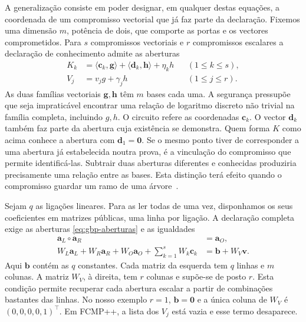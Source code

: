

A generalização consiste em poder designar, em qualquer destas equações,
a coordenada de um compromisso vectorial que já faz parte da declaração.
Fixemos uma dimensão \(m\), potência de dois, que comporte as portas
e os vectores comprometidos. Para \(s\) compromissos vectoriais e
\(r\) compromissos escalares a declaração de conhecimento admite
as aberturas
\begin{equation}
 \begin{aligned}
 K_k&=\langle\boldsymbol c_k,\boldsymbol g\rangle+
       \langle\boldsymbol d_k,\boldsymbol h\rangle+\eta_k h
       &&(1\leq k\leq s),\\
 V_j&=v_jg+\gamma_j h &&(1\leq j\leq r).
 \end{aligned}
 \label{eq:gbp-aberturas}
\end{equation}
As duas famílias vectoriais \(\boldsymbol g,\boldsymbol h\) têm
\(m\) bases cada uma. A segurança pressupõe que seja impraticável
encontrar uma relação de logaritmo discreto não trivial na família
completa, incluindo \(g,h\). O circuito refere as coordenadas
\(\boldsymbol c_k\). O vector \(\boldsymbol d_k\) também faz parte
da abertura cuja existência se demonstra. Quem forma \(K\) como acima
conhece a abertura com \(\boldsymbol d_1=\boldsymbol 0\). Se o mesmo
ponto tiver de corresponder a uma abertura já estabelecida noutra prova,
é a vinculação do compromisso que permite identificá-las. Subtrair duas
aberturas diferentes e conhecidas produziria precisamente uma relação
entre as bases. Esta distinção terá efeito quando o compromisso guardar
um ramo de uma árvore~\cite{generalized-bulletproofs-fixed,fcmp-composition-review}.

Sejam \(q\) as ligações lineares. Para as ler todas de uma vez,
disponhamos os seus coeficientes em matrizes públicas, uma linha por
ligação. A declaração completa exige as aberturas
\eqref{eq:gbp-aberturas} e as igualdades
\begin{equation}
 \begin{aligned}
  \boldsymbol a_L\circ\boldsymbol a_R&=\boldsymbol a_O,\\
  W_L\boldsymbol a_L+W_R\boldsymbol a_R+W_O\boldsymbol a_O
      +\sum_{k=1}^{s}W_k\boldsymbol c_k
     &=\boldsymbol b+W_V\boldsymbol v .
 \end{aligned}
 \label{eq:gbp-relacao}
\end{equation}
Aqui \(\boldsymbol b\) contém as \(q\) constantes. Cada matriz da
esquerda tem \(q\) linhas e \(m\) colunas. A matriz \(W_V\), à direita,
tem \(r\) colunas e supõe-se de posto \(r\). Esta condição permite
recuperar cada abertura escalar a partir de combinações bastantes das
linhas. No nosso exemplo \(r=1\), \(\boldsymbol b=\boldsymbol0\) e a
única coluna de \(W_V\) é \((0,0,0,0,1)^\top\). Em FCMP++, a lista
dos \(V_j\) está vazia e esse termo desaparece.

